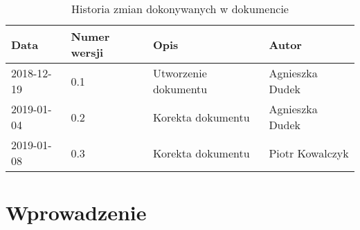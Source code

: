\documentclass{article}
\begin{document}
\begin{titlepage}






\end{titlepage}

\addtocounter{page}{1}
\newpage

\begin{table}[h!]
	\begin{center}
		\caption{Historia zmian dokonywanych w dokumencie}
		\begin{tabular}{|l|l|l|l|}
			\hline
			Data & Numer wersji & Opis & Autor \\
			\hline \hline
			2018-12-19 & 0.1 & Utworzenie dokumentu & Agnieszka Dudek \\
			\hline \hline
			2019-01-04 & 0.2 & Korekta dokumentu & Agnieszka Dudek \\
			\hline \hline
			2019-01-08 & 0.3 & Korekta dokumentu & Piotr Kowalczyk \\
			\hline 
    \end{tabular}
	\end{center}
\end{table}	

\tableofcontents

\newpage


\section{Wprowadzenie}
\end{document}
